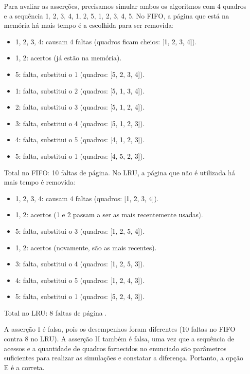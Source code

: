\documentclass[12pt,a4paper]{article}
\begin{document}
Para avaliar as asserções, precisamos simular ambos os algoritmos com 4 quadros e a sequência 1, 2, 3, 4, 1, 2, 5, 1, 2, 3, 4, 5.
No FIFO, a página que está na memória há mais tempo é a escolhida para ser removida:
\begin{footnotesize}
\begin{itemize}
    \item 1, 2, 3, 4: causam 4 faltas (quadros ficam cheios: [1, 2, 3, 4]).
    \item 1, 2: acertos (já estão na memória).
    \item 5: falta, substitui o 1 (quadros: [5, 2, 3, 4]).
    \item 1: falta, substitui o 2 (quadros: [5, 1, 3, 4]).
    \item 2: falta, substitui o 3 (quadros: [5, 1, 2, 4]).
    \item 3: falta, substitui o 4 (quadros: [5, 1, 2, 3]).
    \item 4: falta, substitui o 5 (quadros: [4, 1, 2, 3]).
    \item 5: falta, substitui o 1 (quadros: [4, 5, 2, 3]).
\end{itemize}
\end{footnotesize}
Total no FIFO: 10 faltas de página.
No LRU, a página que não é utilizada há mais tempo é removida:
\begin{footnotesize}
\begin{itemize}
    \item 1, 2, 3, 4: causam 4 faltas (quadros: [1, 2, 3, 4]).
    \item 1, 2: acertos (1 e 2 passam a ser as mais recentemente usadas).
    \item 5: falta, substitui o 3 (quadros: [1, 2, 5, 4]).
    \item 1, 2: acertos (novamente, são as mais recentes).
    \item 3: falta, substitui o 4 (quadros: [1, 2, 5, 3]).
    \item 4: falta, substitui o 5 (quadros: [1, 2, 4, 3]).
    \item 5: falta, substitui o 1 (quadros: [5, 2, 4, 3]).
\end{itemize}
\end{footnotesize}
Total no LRU: 8 faltas de página \parencite[seç.~3.4]{tanenbaum2016}.

A asserção I é falsa, pois os desempenhos foram diferentes (10 faltas no FIFO contra 8 no LRU).
A asserção II também é falsa, uma vez que a sequência de acessos e a quantidade de quadros fornecidos
no enunciado são parâmetros suficientes para realizar as simulações e constatar a diferença.
Portanto, a opção E é a correta.
\end{document}
